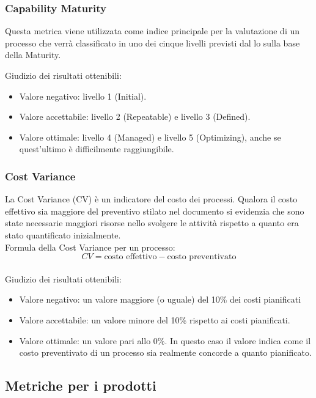 \documentclass[a4paper, titlepage]{article}
\begin{document}
\subsubsection{Capability Maturity }
\label{par:cmm}
Questa metrica viene utilizzata come indice principale per la valutazione di un processo che verrà classificato in uno dei cinque livelli previsti dal lo sulla base della Maturity.
\par Giudizio dei risultati ottenibili:
\begin{itemize}
\item Valore negativo: livello 1 (Initial).
\item Valore accettabile: livello 2 (Repeatable) e livello 3 (Defined).
\item Valore ottimale: livello 4 (Managed) e livello 5 (Optimizing), anche se quest'ultimo è difficilmente raggiungibile.
\end{itemize}

\subsubsection{Cost Variance}
\label{par:CV}
La Cost Variance (CV) è un indicatore del costo dei processi. Qualora il costo effettivo sia maggiore del preventivo stilato nel documento  si evidenzia che sono state necessarie maggiori risorse nello svolgere le attività rispetto a quanto era stato quantificato inizialmente.
\\Formula della Cost Variance per un processo:
\begin{displaymath}
CV= \mbox{costo effettivo} - \mbox{costo preventivato}
\end{displaymath}
\\ Giudizio dei risultati ottenibili:
\begin{itemize}
\item Valore negativo: un valore maggiore (o uguale) del 10\% dei costi pianificati
\item Valore accettabile: un valore minore del 10\% rispetto ai costi pianificati.
\item Valore ottimale: un valore pari allo 0\%. In questo caso il valore indica come il costo preventivato di un processo sia realmente concorde a quanto pianificato. 
\end{itemize}

\subsection{Metriche per i prodotti}
\end{document}

